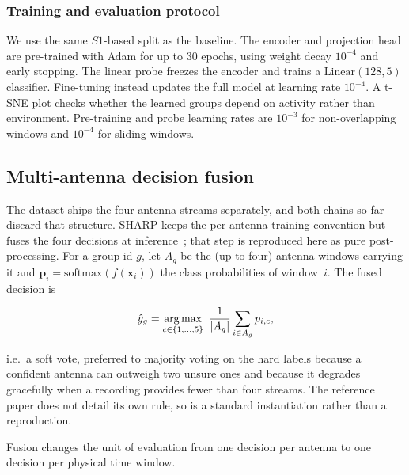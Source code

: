 \subsubsection{Training and evaluation protocol}
We use the same $S1$-based split as the baseline. The encoder and projection
head are pre-trained with Adam for up to $30$ epochs, using weight decay
$10^{-4}$ and early stopping. The linear probe freezes the encoder and trains a
$\mathrm{Linear}(128,5)$ classifier. Fine-tuning instead updates the full model
at learning rate $10^{-4}$. A t-SNE plot checks whether the learned groups
depend on activity rather than environment. Pre-training and probe learning
rates are $10^{-3}$ for non-overlapping windows and $10^{-4}$ for sliding
windows.

\subsection{Multi-antenna decision fusion}
\label{sec:fusion}
The dataset ships the four antenna streams separately, and both chains so
far discard that structure. SHARP keeps the per-antenna training convention but
fuses the four decisions at inference~\cite{sharp}; that step is reproduced here
as pure post-processing. For a group id $g$, let $A_g$ be the (up to four)
antenna windows carrying it and $\bm{p}_i=\mathrm{softmax}(f(\bm{x}_i))$ the class
probabilities of window~$i$. The fused decision is

\begin{equation}
\label{eq:fusion}
\hat{y}_g=\operatorname*{arg\,max}_{c\in\{1,\dots,5\}}\ \frac{1}{|A_g|}\sum_{i\in A_g} p_{i,c},
\end{equation}

i.e.\ a soft vote, preferred to majority voting on the hard labels because
a confident antenna can outweigh two unsure ones and because it degrades
gracefully when a recording provides fewer than four streams. The reference paper
does not detail its own rule, so  is a standard instantiation
rather than a reproduction.

Fusion changes the unit of evaluation from one decision per antenna to one
decision per physical time window.
